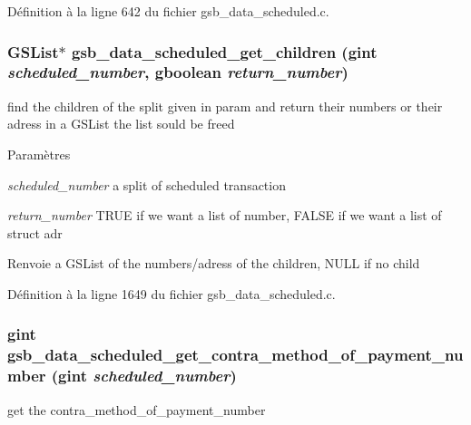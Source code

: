 Définition à la ligne 642 du fichier gsb\_\-data\_\-scheduled.c.

\subsubsection[{gsb\_\-data\_\-scheduled\_\-get\_\-children}]{\setlength{\rightskip}{0pt plus 5cm}GSList$\ast$ gsb\_\-data\_\-scheduled\_\-get\_\-children (gint {\em scheduled\_\-number}, \/  gboolean {\em return\_\-number})}\label{gsb__data__scheduled_8c_a847827a8c847bd6f7332e7d0b2d4ecf6}
find the children of the split given in param and return their numbers or their adress in a GSList the list sould be freed


\begin{DoxyParams}{Paramètres}
\item[{\em scheduled\_\-number}]a split of scheduled transaction \item[{\em return\_\-number}]TRUE if we want a list of number, FALSE if we want a list of struct adr\end{DoxyParams}
\begin{DoxyReturn}{Renvoie}
a GSList of the numbers/adress of the children, NULL if no child 
\end{DoxyReturn}


Définition à la ligne 1649 du fichier gsb\_\-data\_\-scheduled.c.

\subsubsection[{gsb\_\-data\_\-scheduled\_\-get\_\-contra\_\-method\_\-of\_\-payment\_\-number}]{\setlength{\rightskip}{0pt plus 5cm}gint gsb\_\-data\_\-scheduled\_\-get\_\-contra\_\-method\_\-of\_\-payment\_\-number (gint {\em scheduled\_\-number})}\label{gsb__data__scheduled_8c_aa695866444c64f390288fbea3f76de98}
get the contra\_\-method\_\-of\_\-payment\_\-number


